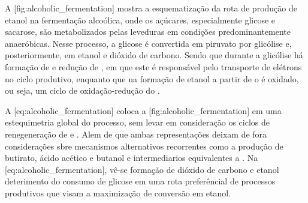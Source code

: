 	\startplacefigure[title={Mecanismo genérico parcial de fermentação alcoólica}, reference={fig:alcoholic_fermentation}]
	\stopplacefigure

	A [fig:alcoholic_fermentation] mostra a esquematização da rota de produção de etanol na fermentação alcoólica, onde os açúcares, especialmente glicose e sacarose, são metabolizados pelas leveduras em condições predominantemente anaeróbicas. Nesse processo, a glicose é convertida em piruvato por glicólise e, posteriormente, em etanol e dióxido de carbono. Sendo que durante a glicólise há formação de  e redução de , em que este é responsável pelo transporte de elétrons no ciclo produtivo, enquanto que na formação de etanol a partir de  o  é oxidado, ou seja, um ciclo de oxidação-redução do .

	\startplaceformula[reference={eq:alcoholic_fermentation}]
		\startformula
			\startchemicalformula
			\stopchemicalformula
		\stopformula
	\stopplaceformula

	A [eq:alcoholic_fermentation] coloca a [fig:alcoholic_fermentation] em uma estequimetria global do processo, sem levar em consideração os ciclos de renegeneração de  e . Alem de que ambas representações deixam de fora considerações sbre mecanismos alternativos recorrentes como a produção de butirato, ácido acético e butanol e intermediarios equivalentes a . Na [eq:alcoholic_fermentation], vê-se formação de dióxido de carbono e etanol deterimento do consumo de glicose em uma rota preferêncial de processos produtivos que visam a maximização de conversão em etanol.
\stopsection

